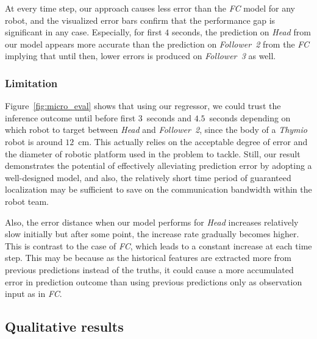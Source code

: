 \documentclass[letterpaper, 10 pt, conference]{ieeeconf}  %
\begin{document}
    At every time step, our approach causes less error than the
    \emph{FC} model for any robot, and the visualized error bars confirm
    that the performance gap is significant in any case. Especially, for
    first $4$ seconds, the prediction on \emph{Head} from our model
    appears more accurate than the prediction on \emph{Follower~2} from
    the \emph{FC} implying that until then, lower errors is produced on
    \emph{Follower~3} as well.

    \subsubsection{Limitation}
	\label{sec:limitation}

    Figure~\ref{fig:micro_eval} shows that using our regressor, we could
    trust the inference outcome until before first $3$~seconds and
    $4.5$~seconds depending on which robot to target between \emph{Head}
    and \emph{Follower~2}, since the body of a \emph{Thymio} robot is
    around $12$~cm. This actually relies on the acceptable degree of
    error and the diameter of robotic platform used in the problem to
    tackle. Still, our result demonstrates the potential of effectively
    alleviating prediction error by adopting a well-designed model, and
    also, the relatively short time period of guaranteed localization
    may be sufficient to save on the communication bandwidth within the
    robot team.

    Also, the error distance when our model performs for \emph{Head}
    increases relatively slow initially but after some point, the
    increase rate gradually becomes higher. This is contrast to the case
    of \emph{FC}, which leads to a constant increase at each time step.
    This may be because as the historical features are extracted more
    from previous predictions instead of the truths, it could cause a
    more accumulated error in prediction outcome than using previous
    predictions only as observation input as in \emph{FC}.

	\subsection{Qualitative results}
	\label{sec:qualitative_results}
\end{document}
